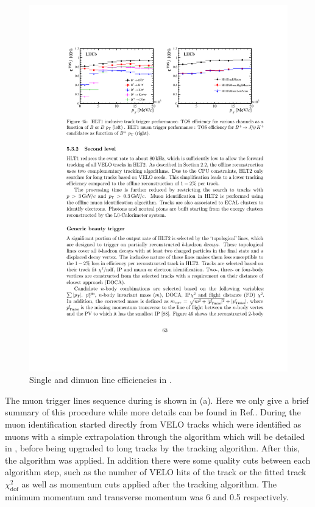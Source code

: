 \begin{figure}[h!]
  \centering
  \includegraphics[trim=11cm 20.5cm 2cm 3cm, clip=true,scale=1.]{Figures/Chapter3/hlt1_muon_eff_run1.pdf}
  \caption{ Single and dimuon \hltone line efficiencies in \runone \cite{LHCb-PROC-2014-005}. }
  \label{fig:hlt1_eff_run1}
\end{figure}


The \hltone muon trigger lines sequence during \runone is shown in (a).
Here we only give a brief summary of this procedure while more details can be found in Ref.\cite{LHCb-PUB-2011-017}.
During \runone the muon identification started directly from VELO tracks
which were identified as muons with a simple extrapolation through the \mvm algorithm\cite{LHCb-PUB-2011-017}
which will be detailed in ,
before being upgraded to long tracks by the \FwD tracking algorithm.
After this, the  algorithm was applied.
In addition there were some quality cuts between each algorithm step, such as the number of VELO hits
of the track or the fitted track $\chi^2_{\text {dof}}$ as well as momentum cuts applied after the \FwD tracking algorithm.
The minimum momentum and transverse momentum was 6 \gevc and 0.5 \gevc respectively.

